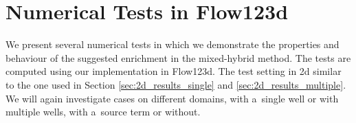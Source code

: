 
  
  
\section{Numerical Tests in Flow123d}
We present several numerical tests in which we demonstrate the properties and behaviour of the suggested enrichment in the mixed-hybrid method.
The tests are computed using our implementation in Flow123d.
The test setting in 2d similar to the one used in Section \ref{sec:2d_results_single} and \ref{sec:2d_results_multiple}.
We will again investigate cases on different domains, with a~single well or with multiple wells, with a~source term or without.

